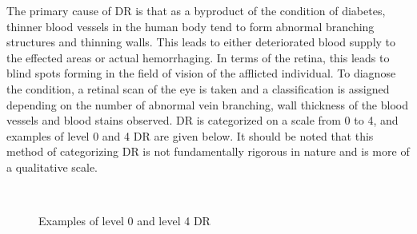 \documentclass[letterpaper,12pt]{article}
\begin{document}
The primary cause of DR is that as a byproduct of the condition of diabetes, thinner blood vessels in the human body tend to form abnormal branching structures and thinning walls. This leads to either deteriorated blood supply to the effected areas or actual hemorrhaging. In terms of the retina, this leads to blind spots forming in the field of vision of the afflicted individual. 
To diagnose the condition, a retinal scan of the eye is taken and a classification is assigned depending on the number of abnormal vein branching, wall thickness of the blood vessels and blood stains observed. DR is categorized on a scale from 0 to 4, and examples of level 0 and 4 DR are given below. It should be noted that this method of categorizing DR is not fundamentally rigorous in nature and is more of a qualitative scale. 

\begin{figure}[htbp]
\begin{center}
  \ \ \ \ 
\caption{Examples of level 0 and level 4 DR}
\label{marking_image}
\end{center}
\end{figure}
\end{document}
